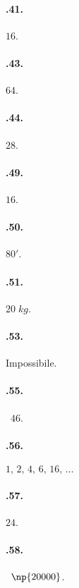 \begin{multicols}{2}
\paragraph{\thechapter.41.}
$16$.

\paragraph{\thechapter.43.}
$64$.

\paragraph{\thechapter.44.}
$28$.

\paragraph{\thechapter.49.}
$16$.

\paragraph{\thechapter.50.}
$80'$.

\paragraph{\thechapter.51.}
$20\;\unit{kg}$.

\paragraph{\thechapter.53.}
Impossibile.

\paragraph{\thechapter.55.}
\officialeuro~$46$.

\paragraph{\thechapter.56.}
$1\text{,~}2\text{,~}4\text{,~}6\text{,~}16\text{,~}\ldots$

\paragraph{\thechapter.57.}
$24$.

\paragraph{\thechapter.58.}
\officialeuro~$\np{20000}$.


\end{multicols}
